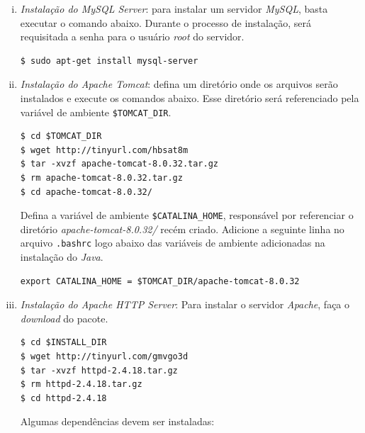 \begin {enumerate}[i.]
\begin{lstlisting}[keywordstyle=\ttfamily, style=nonumbers]
export JAVA_HOME="/usr/lib/jvm/java-8-openjdk-amd64"
export JRE_HOME="/usr/lib/jvm/java-8-openjdk-amd64/jre"
\end{lstlisting}

\item \textit{Instalação do MySQL Server}: para instalar um servidor
\textit{MySQL}, basta executar o comando abaixo. Durante o processo de
instalação, será requisitada a senha para o usuário \textit{root} do servidor. 
\begin{lstlisting}[keywordstyle=\ttfamily, style=nonumbers]
$ sudo apt-get install mysql-server
\end{lstlisting}

\item \textit{Instalação do Apache Tomcat}: defina um diretório onde os arquivos
serão instalados e execute os comandos abaixo. Esse diretório será referenciado
pela variável de ambiente \texttt{\$TOMCAT\_DIR}.

\begin{lstlisting}[keywordstyle=\ttfamily, style=nonumbers]
$ cd $TOMCAT_DIR
$ wget http://tinyurl.com/hbsat8m
$ tar -xvzf apache-tomcat-8.0.32.tar.gz
$ rm apache-tomcat-8.0.32.tar.gz
$ cd apache-tomcat-8.0.32/
\end{lstlisting}

Defina a variável de ambiente \texttt{\$CATALINA\_HOME}, responsável por
referenciar o diretório \textit{apache-tomcat-8.0.32/} recém criado. Adicione a
seguinte linha no arquivo \texttt{.bashrc} logo abaixo das variáveis de ambiente
adicionadas na instalação do \textit{Java}.

\begin{lstlisting}[keywordstyle=\ttfamily, style=nonumbers]
export CATALINA_HOME = $TOMCAT_DIR/apache-tomcat-8.0.32
\end{lstlisting}

\item \textit{Instalação do Apache HTTP Server}: Para instalar o servidor
\textit{Apache}, faça o \textit{download} do pacote. 

\begin{lstlisting}[keywordstyle=\ttfamily, style=nonumbers]
$ cd $INSTALL_DIR
$ wget http://tinyurl.com/gmvgo3d
$ tar -xvzf httpd-2.4.18.tar.gz
$ rm httpd-2.4.18.tar.gz
$ cd httpd-2.4.18
\end{lstlisting}

Algumas dependências devem ser instaladas:


\end{enumerate}
